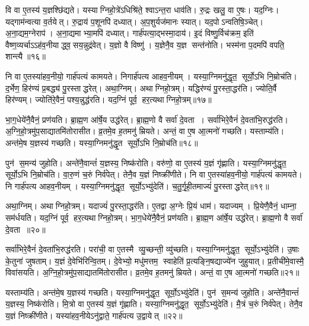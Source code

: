 वि वा ए॒तस्य॑ य॒ज्ञश्छि॑द्यते।
यस्याग्निहो॒त्रे॑ऽधिश्रि॑ते॒ श्वाऽन्त॒रा धाव॑ति।
रु॒द्रः खलु॒ वा ए॒षः।
यद॒ग्निः।
यद्गाम॑न्वत्या व॒र्तयेत्।
रु॒द्राय॑ प॒शूनपि॑ दध्यात्।
अ॒प॒शुर्यज॑मानः स्यात्।
यद॒पोऽन्वतिषि॒ञ्चेत्।
अ॒ना॒द्यम॒ग्नेराप॑।
अ॒ना॒द्यमाभ्या॒मपि॑ दध्यात्।
गार्\mbox{}ह॑पत्या॒द्भस्मा॒दाय॑।
इ॒दं विष्णु॒र्विच॑क्रम॒ इति॑ वैष्ण॒व्यर्चाऽऽह॑व॒नीयाद्ध्व॒सय॒न्नुद्र॑वेत्।
य॒ज्ञो वै विष्णु॑।
य॒ज्ञेनै॒व य॒ज्ञ सन्त॑नोति।
भस्म॑ना प॒दमपि॑ वपति॒ शान्त्यै॥१६॥\anuvakamend[वै दे॒व्यदि॑तिर्मुञ्चति सृजति करोति करोत्याभ्या॒मपि॑ दध्या॒त् पञ्च॑ च]

नि वा ए॒तस्या॑हव॒नीयो॒ गार्\mbox{}ह॑पत्यं कामयते।
निगार्\mbox{}ह॑पत्य आहव॒नीयम्।
यस्या॒ग्निमनु॑द्धृत॒ सूर्यो॒ऽभि नि॒म्रोच॑ति।
द॒र्भेण॒ हिर॑ण्यं प्र॒बद्ध्य॑ पु॒रस्ताद्धरेत्।
अथा॒ग्निम्।
अथाग्निहो॒त्रम्।
यद्धिर॑ण्यं पु॒रस्ता॒द्धर॑ति।
ज्योति॒र्वै हिर॑ण्यम्।
ज्योति॑रे॒वैनं॒ पश्य॒न्नुद्ध॑रति।
यद॒ग्निं पूर्व॒ हर॒त्यथाग्निहो॒त्रम्॥१७॥

भा॒ग॒धेये॑नै॒वैनं॒ प्रण॑यति।
ब्रा॒ह्म॒ण आ॑र्\mbox{}षे॒य उद्ध॑रेत्।
ब्रा॒ह्म॒णो वै सर्वा॑ दे॒वता।
सर्वा॑भिरे॒वैनं॑ दे॒वता॑भि॒रुद्ध॑रति।
अ॒ग्नि॒हो॒त्रमु॑प॒साद्यातमि॑तोरासीत।
व्र॒तमे॒व ह॒तमनु॑ म्रियते।
अन्तं॒ वा ए॒ष आ॒त्मनो॑ गच्छति।
यस्ताम्य॑ति।
अन्त॑मे॒ष य॒ज्ञस्य॑ गच्छति।
यस्या॒ग्निमनु॑द्धृ॒त सूर्यो॒ऽभि नि॒म्रोच॑ति॥१८॥

पुन॑ स॒मन्य॑ जुहोति।
अन्ते॑नै॒वान्तं॑ य॒ज्ञस्य॒ निष्क॑रोति।
वरु॑णो॒ वा ए॒तस्य॑ य॒ज्ञं गृ॑ह्णाति।
यस्या॒ग्निमनु॑द्धृत॒ सूर्यो॒ऽभि नि॒म्रोच॑ति।
वा॒रु॒णं च॒रुं निर्व॑पेत्।
तेनै॒व य॒ज्ञं निष्क्री॑णीते।
नि वा ए॒तस्या॑हव॒नीयो॒ गार्\mbox{}ह॑पत्यं कामयते।
नि गार्\mbox{}ह॑पत्य आहव॒नीयम्।
यस्या॒ग्निमनु॑द्धृत॒ सूर्यो॒ऽभ्यु॑देति॑।
च॒तु॒र्गृ॒ही॒तमाज्यं॑ पु॒रस्ताद्धरेत्॥१९॥

अथा॒ग्निम्।
अथाग्निहो॒त्रम्।
यदाज्यं॑ पु॒रस्ता॒द्धर॑ति।
ए॒तद्वा अ॒ग्नेः प्रि॒यं धाम॑।
यदाज्यम्।
प्रि॒येणै॒वैनं॒ धाम्ना॒ सम॑र्धयति।
यद॒ग्निं पूर्व॒ हर॒त्यथाग्निहो॒त्रम्।
भा॒ग॒धेये॑नै॒वैनं॒ प्रण॑यति।
ब्रा॒ह्म॒ण आ॑र्\mbox{}षे॒य उद्ध॑रेत्।
ब्रा॒ह्म॒णो वै सर्वा॑ दे॒वता॥२०॥

सर्वा॑भिरे॒वैनं॑ दे॒वता॑भि॒रुद्ध॑रति।
परा॑ची॒ वा ए॒तस्मै व्यु॒च्छन्ती॒ व्यु॑च्छति।
यस्या॒ग्निमनु॑द्धृत॒ सूर्यो॒ऽभ्यु॑देति॑।
उ॒षाः के॒तुना॑ जुषताम्।
य॒ज्ञं दे॒वेभि॑रिन्वि॒तम्।
दे॒वेभ्यो॒ मधु॑मत्तम॒ स्वाहेति॑ प्र॒त्यङ्नि॒षद्याज्ये॑न जुहुयात्।
प्र॒तीची॑मे॒वास्मै॒ विवा॑सयति।
अ॒ग्नि॒हो॒त्रमु॑प॒साद्यातमि॑तोरासीत।
व्र॒तमे॒व ह॒तमनु॑ म्रियते।
अन्तं॒ वा ए॒ष आ॒त्मनो॑ गच्छति॥२१॥

यस्ताम्य॑ति।
अन्त॑मे॒ष य॒ज्ञस्य॑ गच्छति।
यस्या॒ग्निमनु॑द्धृत॒ सूर्यो॒ऽभ्यु॑देति॑।
पुन॑ स॒मन्य॑ जुहोति।
अन्ते॑नै॒वान्तं॑ य॒ज्ञस्य॒ निष्क॑रोति।
मि॒त्रो वा ए॒तस्य॑ य॒ज्ञं गृ॑ह्णाति।
यस्या॒ग्निमनु॑द्धृत॒ सूर्यो॒ऽभ्यु॑देति॑।
मै॒त्रं च॒रुं निर्व॑पेत्।
तेनै॒व य॒ज्ञं निष्क्री॑णीते।
यस्या॑हव॒नीयेऽनु॑द्वाते॒ गार्\mbox{}ह॑पत्य उ॒द्वायेत् ॥२२॥

